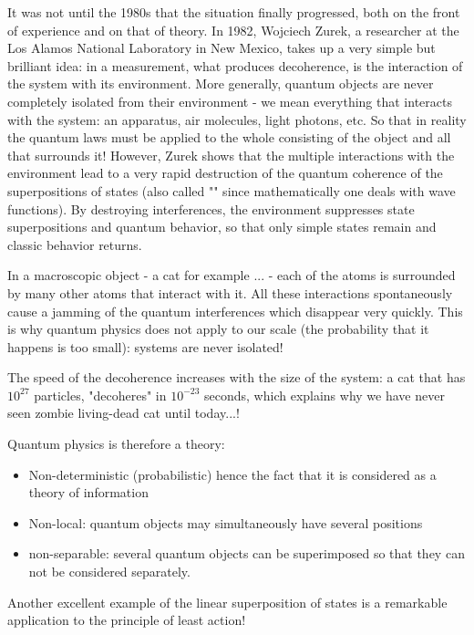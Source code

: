 	It was not until the 1980s that the situation finally progressed, both on the front of experience and on that of theory. In 1982, Wojciech Zurek, a researcher at the Los Alamos National Laboratory in New Mexico, takes up a very simple but brilliant idea: in a measurement, what produces decoherence, is the interaction of the system with its environment. More generally, quantum objects are never completely isolated from their environment - we mean everything that interacts with the system: an apparatus, air molecules, light photons, etc. So that in reality the quantum laws must be applied to the whole consisting of the object and all that surrounds it! However, Zurek shows that the multiple interactions with the environment lead to a very rapid destruction of the quantum coherence of the superpositions of states (also called "" since mathematically one deals with wave functions). By destroying interferences, the environment suppresses state superpositions and quantum behavior, so that only simple states remain and classic behavior returns.
	
	In a macroscopic object - a cat for example ... - each of the atoms is surrounded by many other atoms that interact with it. All these interactions spontaneously cause a jamming of the quantum interferences which disappear very quickly. This is why quantum physics does not apply to our scale (the probability that it happens is too small): systems are never isolated!

	The speed of the decoherence increases with the size of the system: a cat that has $10^{27}$ particles, "decoheres" in $10^{-23}$ seconds, which explains why we have never seen zombie living-dead cat until today...!
	
	Quantum physics is therefore a theory:
	\begin{itemize}
		\item Non-deterministic (probabilistic) hence the fact that it is considered as a theory of information

		\item Non-local: quantum objects may simultaneously have several positions

		\item non-separable: several quantum objects can be superimposed so that they can not be considered separately.
	\end{itemize}
	Another excellent example of the linear superposition of states is a remarkable application to the principle of least action!

